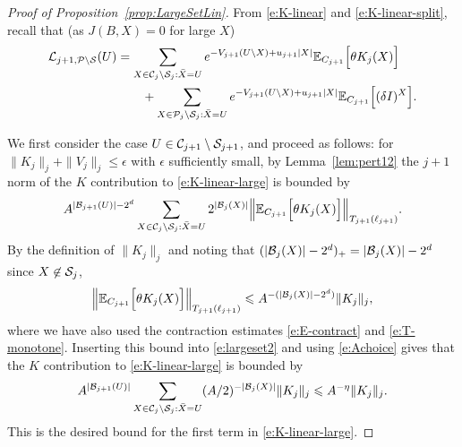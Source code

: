 \documentclass[11pt]{amsart}
\numberwithin{equation}{section}
\numberwithin{theorem}{section}
\newcommand{\1}{{\bf 1}}
\begin{document}
\begin{proof}[Proof of Proposition~\ref{prop:LargeSetLin}]
From \eqref{e:K-linear} and \eqref{e:K-linear-split},
recall that (as $J(B,X)=0$ for large $X$)
\begin{align}\label{e:K-linear-large}
  \mathcal L_{j+1, \mathcal P\setminus \mathcal S}(U)
  &= \sum_{X\in \mathcal C_j \setminus \mathcal S_j: \bar X=U} e^{-V_{j+1}(U\setminus X)+u_{j+1}|X|} \mathbb{E}_{C_{j+1}}\Bigl[{ \theta K_j(X)}\Bigr]
  \\
  &\qquad + \sum_{X\in \mathcal P_j \setminus \mathcal S_j: \bar X=U} e^{-V_{j+1}(U\setminus X)+u_{j+1}|X|} \mathbb{E}_{C_{j+1}}\Bigl[{ (\delta I)^X }\Bigr].\nonumber
\end{align}

We first consider the case $U\in \mathcal C_{j+1}\setminus \mathcal S_{j+1}$, and proceed as follows:
for $\|K_j\|_j + \|V_j\|_j \leq\epsilon$ with $\epsilon$
sufficiently small, by Lemma~\ref{lem:pert12} the $j+1$
norm of the $K$ contribution to \eqref{e:K-linear-large} is bounded by
\begin{equation} \label{e:largeset2}
  A^{|\mathcal B_{j+1}(U)|-2^d}
  \sum_{X\in \mathcal C_j \setminus \mathcal S_j: \bar X=U}  2^{|\mathcal B_j(X)|} \Bigl\lVert \mathbb{E}_{C_{j+1}}\Bigl[{\theta K_j(X)}\Bigr] \Bigr\rVert_{T_{j+1}(\ell_{j+1})}.
\end{equation}
By the definition of $\|K_{j}\|_{j}$ and
noting that $(|\mathcal B_{j}(X)|-2^{d})_{+}=|\mathcal B_{j}(X)|-2^{d}$ since $X\not\in\mathcal S_{j}$,
\begin{equation}
  \label{E:largeset-inter}
  \Bigl\lVert  \mathbb{E}_{C_{j+1}}\Bigl[{\theta K_j(X)}\Bigr] \Bigr\rVert_{T_{j+1}(\ell_{j+1})}\leqslant A^{-(|\mathcal B_{j}(X)|-2^{d})}\|K_j\|_j,
\end{equation}
where we have also used the contraction estimates
\eqref{e:E-contract} and \eqref{e:T-monotone}.  Inserting this bound into
\eqref{e:largeset2} and using \eqref{e:Achoice} gives that the $K$
contribution to \eqref{e:K-linear-large} is bounded by
\begin{equation} \label{e:largeset3}
   A^{|\mathcal B_{j+1}(U)|}
    \sum_{X\in \mathcal C_j \setminus \mathcal S_j: \bar X=U} (A/2)^{-|\mathcal B_j(X)|}\|K_j\|_{j} \leqslant A^{-\eta} \|K_j\|_{j}.
\end{equation} 
This is the desired bound for the first term in \eqref{e:K-linear-large}.


\end{proof}
\end{document}
